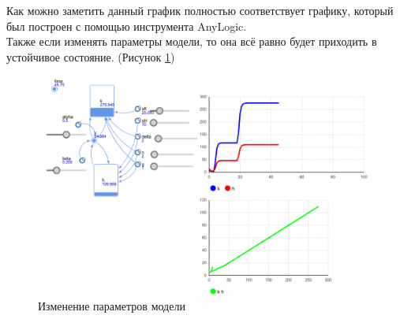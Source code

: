 \documentclass[14pt,fleqn]{extarticle}
\begin{document}
	Как можно заметить данный график полностью соответствует графику, который был построен с помощью инструмента AnyLogic.\\
	
	Также если изменять параметры модели, то она всё равно будет приходить в устойчивое состояние. (Рисунок \ref{fig:M-R-W_anylogic_variance})
	\begin{figure}[h]
		\centering \includegraphics[scale=0.25]{M-R-W_anylogic_variance}
		\caption{Изменение параметров модели}
		\label{fig:M-R-W_anylogic_variance}
	\end{figure}
\end{document}
